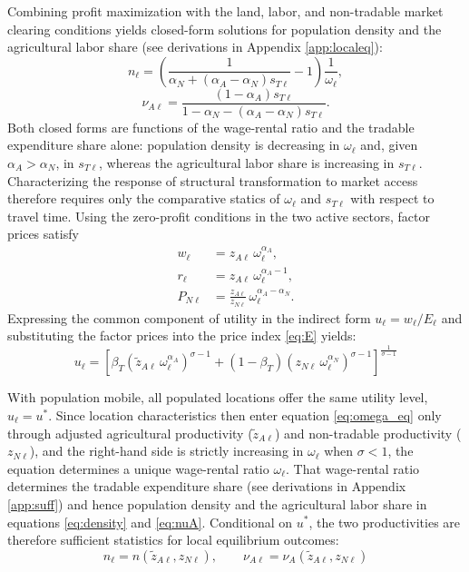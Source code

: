 \documentclass[11pt]{article}
\begin{document}
Combining profit maximization with the land, labor, and non-tradable market clearing conditions yields closed-form solutions for population density and the agricultural labor share (see derivations in Appendix \ref{app:localeq}):
\begin{equation}
n_\ell
=
\left(
\frac{1}{\alpha_N + (\alpha_A-\alpha_N)s_{T\ell}} - 1
\right)
\frac{1}{\omega_\ell},
\label{eq:density}
\end{equation}
\begin{equation}
\nu_{A\ell}
=
\frac{(1-\alpha_A)s_{T\ell}}
{1-\alpha_N-(\alpha_A-\alpha_N)s_{T\ell}}.
\label{eq:nuA}
\end{equation}
Both closed forms are functions of the wage-rental ratio and the tradable expenditure share alone: population density is decreasing in $\omega_\ell$ and, given $\alpha_A>\alpha_N$, in $s_{T\ell}$, whereas the agricultural labor share is increasing in $s_{T\ell}$. Characterizing the response of structural transformation to market access therefore requires only the comparative statics of $\omega_\ell$ and $s_{T\ell}$ with respect to travel time. Using the zero-profit conditions in the two active sectors, factor prices satisfy
\begin{align}
w_\ell &= z_{A\ell}\,\omega_\ell^{\alpha_A},
\label{eq:wage}\\
r_\ell &= z_{A\ell}\,\omega_\ell^{\alpha_A-1},
\label{eq:rent}\\
P_{N\ell} &= \frac{z_{A\ell}}{z_{N\ell}}\,\omega_\ell^{\alpha_A-\alpha_N}.
\label{eq:PN}
\end{align}
Expressing the common component of utility in the indirect form $u_\ell=w_\ell/E_\ell$ and substituting the factor prices into the price index \eqref{eq:E} yields:
\begin{equation}
u_\ell
=
\left[
\beta_T \left(\tilde z_{A\ell}\,\omega_\ell^{\alpha_A}\right)^{\sigma-1}
+
\left(1-\beta_T\right)\left(z_{N\ell}\,\omega_\ell^{\alpha_N}\right)^{\sigma-1}
\right]^{\frac{1}{\sigma-1}}
\label{eq:omega_eq}
\end{equation}

With population mobile, all populated locations offer the same utility level, $u_\ell=u^\ast$. Since location characteristics then enter equation \eqref{eq:omega_eq} only through adjusted agricultural productivity ($\tilde z_{A\ell}$) and non-tradable productivity ($z_{N\ell}$), and the right-hand side is strictly increasing in $\omega_\ell$ when $\sigma<1$, the equation determines a unique wage-rental ratio $\omega_\ell$. That wage-rental ratio determines the tradable expenditure share (see derivations in Appendix \ref{app:suff}) and hence population density and the agricultural labor share in equations \eqref{eq:density} and \eqref{eq:nuA}. Conditional on $u^\ast$, the two productivities are therefore sufficient statistics for local equilibrium outcomes:
\begin{equation}
n_\ell=n\left(\tilde z_{A\ell},z_{N\ell}\right),
\qquad
\nu_{A\ell}=\nu_A\left(\tilde z_{A\ell},z_{N\ell}\right)
\label{eq:reduced_local}
\end{equation}
\end{document}
